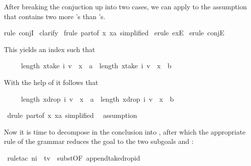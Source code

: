 \begin{isabellebody}
\begin{isamarkuptxt}
After breaking the conjuction up into two cases, we can apply
 to the assumption that  contains two more 's than 's.%
\end{isamarkuptxt}%
rule\ conjI{\isacharparenright}\isanewline
\ clarify{\isacharparenright}\isanewline
\ frule\ part{}{\isacharbrackleft}of\ {\isachardoublequote}{\isasymlambda}x{\isachardot}\ x{\isacharequal}a{\isachardoublequote}{\isacharcomma}\ simplified{\isacharbrackright}{\isacharparenright}\isanewline
\ erule\ exE{\isacharparenright}\isanewline
\ erule\ conjE{\isacharparenright}%
\begin{isamarkuptxt}%
\noindent
This yields an index  such that
\begin{isabelle}%
\ \ \ \ \ length\ {\isacharbrackleft}x{\isasymin}take\ i\ v\ {\isachardot}\ x\ {\isacharequal}\ a{\isacharbrackright}\ {\isacharequal}\ length\ {\isacharbrackleft}x{\isasymin}take\ i\ v\ {\isachardot}\ x\ {\isacharequal}\ b{\isacharbrackright}\ {\isacharplus}\ {}%
\end{isabelle}
With the help of  it follows that
\begin{isabelle}%
\ \ \ \ \ length\ {\isacharbrackleft}x{\isasymin}drop\ i\ v\ {\isachardot}\ x\ {\isacharequal}\ a{\isacharbrackright}\ {\isacharequal}\ length\ {\isacharbrackleft}x{\isasymin}drop\ i\ v\ {\isachardot}\ x\ {\isacharequal}\ b{\isacharbrackright}\ {\isacharplus}\ {}%
\end{isabelle}%
\end{isamarkuptxt}%
\ drule\ part{}{\isacharbrackleft}of\ {\isachardoublequote}{\isasymlambda}x{\isachardot}\ x{\isacharequal}a{\isachardoublequote}{\isacharcomma}\ simplified{\isacharbrackright}{\isacharparenright}\isanewline
\ \ assumption{\isacharparenright}%
\begin{isamarkuptxt}%
\noindent
Now it is time to decompose  in the conclusion 
into ,
after which the appropriate rule of the grammar reduces the goal
to the two subgoals  and :%
\end{isamarkuptxt}%
\ rule{\isacharunderscore}tac\ n{}{\isacharequal}i\ \ t{\isacharequal}v\ \ subst{\isacharbrackleft}OF\ append{\isacharunderscore}take{\isacharunderscore}drop{\isacharunderscore}id{\isacharbrackright}{\isacharparenright}\isanewline

\end{isabellebody}
